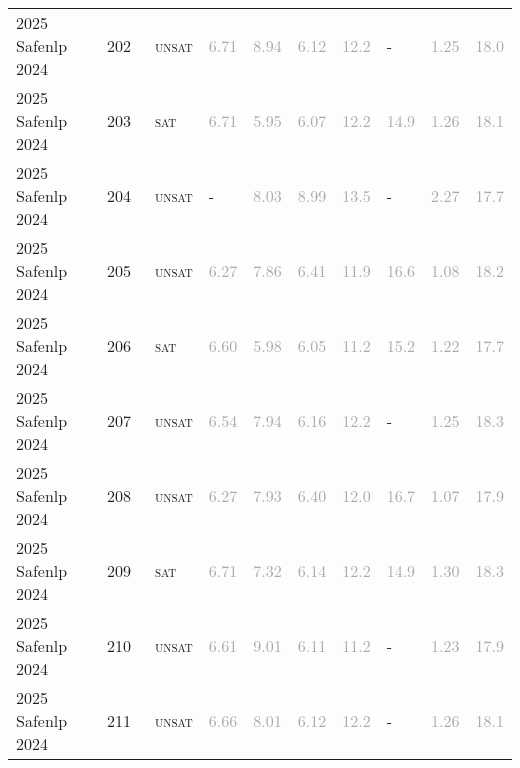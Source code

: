\begin{center}
{\begin{longtable}{@{}llllllllll@{}}
2025 Safenlp 2024 & 202 & ~\textsc{unsat} & \textcolor{darkgray}{6.71} & \textcolor{darkgray}{8.94} & \textcolor{darkgray}{6.12} & \textcolor{darkgray}{12.2} & - & \textcolor{darkgray}{1.25} & \textcolor{darkgray}{18.0} \\
2025 Safenlp 2024 & 203 & ~\textsc{sat} & \textcolor{darkgray}{6.71} & \textcolor{darkgray}{5.95} & \textcolor{darkgray}{6.07} & \textcolor{darkgray}{12.2} & \textcolor{darkgray}{14.9} & \textcolor{darkgray}{1.26} & \textcolor{darkgray}{18.1} \\
2025 Safenlp 2024 & 204 & ~\textsc{unsat} & - & \textcolor{darkgray}{8.03} & \textcolor{darkgray}{8.99} & \textcolor{darkgray}{13.5} & - & \textcolor{darkgray}{2.27} & \textcolor{darkgray}{17.7} \\
2025 Safenlp 2024 & 205 & ~\textsc{unsat} & \textcolor{darkgray}{6.27} & \textcolor{darkgray}{7.86} & \textcolor{darkgray}{6.41} & \textcolor{darkgray}{11.9} & \textcolor{darkgray}{16.6} & \textcolor{darkgray}{1.08} & \textcolor{darkgray}{18.2} \\
2025 Safenlp 2024 & 206 & ~\textsc{sat} & \textcolor{darkgray}{6.60} & \textcolor{darkgray}{5.98} & \textcolor{darkgray}{6.05} & \textcolor{darkgray}{11.2} & \textcolor{darkgray}{15.2} & \textcolor{darkgray}{1.22} & \textcolor{darkgray}{17.7} \\
2025 Safenlp 2024 & 207 & ~\textsc{unsat} & \textcolor{darkgray}{6.54} & \textcolor{darkgray}{7.94} & \textcolor{darkgray}{6.16} & \textcolor{darkgray}{12.2} & - & \textcolor{darkgray}{1.25} & \textcolor{darkgray}{18.3} \\
2025 Safenlp 2024 & 208 & ~\textsc{unsat} & \textcolor{darkgray}{6.27} & \textcolor{darkgray}{7.93} & \textcolor{darkgray}{6.40} & \textcolor{darkgray}{12.0} & \textcolor{darkgray}{16.7} & \textcolor{darkgray}{1.07} & \textcolor{darkgray}{17.9} \\
2025 Safenlp 2024 & 209 & ~\textsc{sat} & \textcolor{darkgray}{6.71} & \textcolor{darkgray}{7.32} & \textcolor{darkgray}{6.14} & \textcolor{darkgray}{12.2} & \textcolor{darkgray}{14.9} & \textcolor{darkgray}{1.30} & \textcolor{darkgray}{18.3} \\
2025 Safenlp 2024 & 210 & ~\textsc{unsat} & \textcolor{darkgray}{6.61} & \textcolor{darkgray}{9.01} & \textcolor{darkgray}{6.11} & \textcolor{darkgray}{11.2} & - & \textcolor{darkgray}{1.23} & \textcolor{darkgray}{17.9} \\
2025 Safenlp 2024 & 211 & ~\textsc{unsat} & \textcolor{darkgray}{6.66} & \textcolor{darkgray}{8.01} & \textcolor{darkgray}{6.12} & \textcolor{darkgray}{12.2} & - & \textcolor{darkgray}{1.26} & \textcolor{darkgray}{18.1} \\

\end{longtable}}
\end{center}

